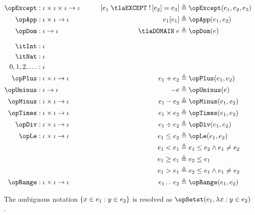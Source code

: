 \documentclass[11pt, a4paper, oneside]{article}
\begin{document}
\begin{alignat*}{4}
    \opExcept       &: \idv \times \idv \times \idv \arr \idv       &\qquad \bx{ e_1 \;\tlaEXCEPT\; !\bx{e_2} = e_3 } &\triangleq \opExcept(e_1, e_2, e_3) \\
    \opApp          &: \idv \times \idv \arr \idv                   &\qquad e_1\!\bx{e_1}           &\triangleq \opApp(e_1, e_2) \\
    \opDom          &: \idv \arr \idv                               &\qquad \tlaDOMAIN\; e          &\triangleq \opDom(e) \\[7pt]
    \itInt          &: \idv \\
    \itNat          &: \idv \\
    0, 1, 2, \dots  &: \idv \\
    \opPlus         &: \idv \times \idv \arr \idv                   &\qquad e_1 + e_2               &\triangleq \opPlus(e_1, e_2) \\
    \opUminus       &: \idv \arr \idv                               &\qquad - e                     &\triangleq \opUminus(e) \\
    \opMinus        &: \idv \times \idv \arr \idv                   &\qquad e_1 - e_2               &\triangleq \opMinus(e_1, e_2) \\
    \opTimes        &: \idv \times \idv \arr \idv                   &\qquad e_1 \times e_2          &\triangleq \opTimes(e_1, e_2) \\
    \opDiv          &: \idv \times \idv \arr \idv                   &\qquad e_1 \div e_2            &\triangleq \opDiv(e_1, e_2) \\
    \opLe           &: \idv \times \idv \arr \idv                   &\qquad e_1 \le e_2             &\triangleq \opLe(e_1, e_2) \\
                                                                &   &\qquad e_1 < e_1               &\triangleq e_1 \le e_2 \wedge e_1 \neq e_2 \\
                                                                &   &\qquad e_1 \ge e_1             &\triangleq e_2 \le e_1 \\
                                                                &   &\qquad e_1 > e_1               &\triangleq e_2 \le e_1 \wedge e_1 \neq e_2 \\
    \opRange        &: \idv \times \idv \arr \idv                   &\qquad e_1 \ltwodots e_2       &\triangleq \opRange(e_1, e_2) 
\end{alignat*}

The ambiguous notation $\left\{  x \in e_1 : y \in e_2  \right\}$ is resolved as $\opSetst(e_1, \lambda x : y \in e_2)$.
\end{document}
